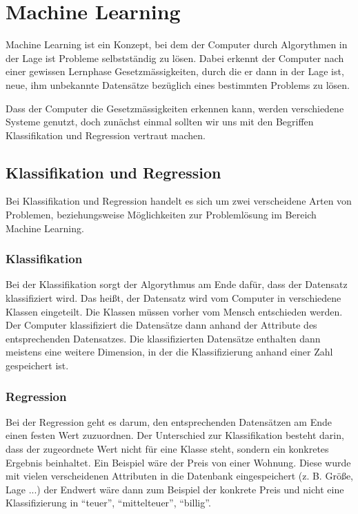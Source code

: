 \newcommand{\norm}[1]{\left\lVert#1\right\rVert}


\section{Machine Learning}
\author{Farhadiba Mohammed, Dennis Kempf, David Steinmann}
Machine Learning ist ein Konzept, bei dem der Computer durch Algorythmen in der Lage ist Probleme selbstständig zu lösen. Dabei erkennt der Computer nach einer gewissen Lernphase Gesetzmässigkeiten, durch die er dann in der Lage ist, neue, ihm unbekannte Datensätze bezüglich eines bestimmten Problems zu lösen.

Dass der Computer die Gesetzmässigkeiten erkennen kann, werden verschiedene Systeme genutzt, doch zunächst einmal sollten wir uns mit den Begriffen Klassifikation und Regression vertraut machen.


\subsection{Klassifikation und Regression}
\author{David Steinmann}
Bei Klassifikation und Regression handelt es sich um zwei verscheidene Arten von Problemen, beziehungsweise Möglichkeiten zur Problemlösung im Bereich Machine Learning.

\subsubsection{Klassifikation}
Bei der Klassifikation sorgt der Algorythmus am Ende dafür, dass der Datensatz klassifiziert wird. Das heißt, der Datensatz wird vom Computer in verschiedene Klassen eingeteilt. Die Klassen müssen vorher vom Mensch entschieden werden. Der Computer klassifiziert die Datensätze dann anhand der Attribute des entsprechenden Datensatzes. Die klassifizierten Datensätze enthalten dann meistens eine weitere Dimension, in der die Klassifizierung anhand einer Zahl gespeichert ist.

\subsubsection{Regression}
Bei der Regression geht es darum, den entsprechenden Datensätzen am Ende einen festen Wert zuzuordnen. Der Unterschied zur Klassifikation besteht darin, dass der zugeordnete Wert nicht für eine Klasse steht, sondern ein konkretes Ergebnis beinhaltet. Ein Beispiel wäre der Preis von einer Wohnung. Diese wurde mit vielen verscheidenen Attributen in die Datenbank eingespeichert (z. B. Größe, Lage ...) der Endwert wäre dann zum Beispiel der konkrete Preis und nicht eine Klassifizierung in "`teuer"', "`mittelteuer"', "`billig"'. 

